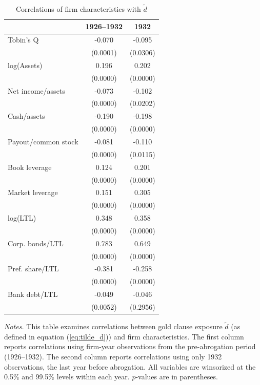 \begin{table}[p]\centering
\caption{\\ Correlations of firm characteristics with $\tilde{d}$}
\label{tabapp:correlation} \scriptsize
\renewcommand{\arraystretch}{1.2}
    \begin{threeparttable}
        \begin{tabular}{lcc}
            \toprule
            & 1926--1932 & 1932 \\
            \midrule
            Tobin's Q & -0.070 & -0.095 \\
            & (0.0001) & (0.0306) \\
            log(Assets) & 0.196 & 0.202 \\
            & (0.0000) & (0.0000) \\
            Net income/assets & -0.073 & -0.102 \\
            & (0.0000) & (0.0202) \\
            Cash/assets & -0.190 & -0.198 \\
            & (0.0000) & (0.0000) \\
            Payout/common stock & -0.081 & -0.110 \\
            & (0.0000) & (0.0115) \\
            Book leverage & 0.124 & 0.201 \\
            & (0.0000) & (0.0000) \\
            Market leverage & 0.151 & 0.305 \\
            & (0.0000) & (0.0000) \\
            log(LTL) & 0.348 & 0.358 \\
            & (0.0000) & (0.0000) \\
            Corp. bonds/LTL & 0.783 & 0.649 \\
            & (0.0000) & (0.0000) \\
            Pref. share/LTL & -0.381 & -0.258 \\
            & (0.0000) & (0.0000) \\
            Bank debt/LTL & -0.049 & -0.046 \\
            & (0.0052) & (0.2956) \\
            \bottomrule
        \end{tabular}
    \end{threeparttable}

\vspace*{3mm} \justifying \noindent
\footnotesize{\textit{Notes.} This table examines correlations between gold clause exposure $\tilde{d}$ (as defined in equation (\ref{eq:tilde_d})) and firm characteristics. The first column reports correlations using firm-year observations from the pre-abrogation period (1926--1932). The second column reports correlations using only 1932 observations, the last year before abrogation. All variables are winsorized at the 0.5\% and 99.5\% levels within each year. $p$-values are in parentheses.}
\end{table}